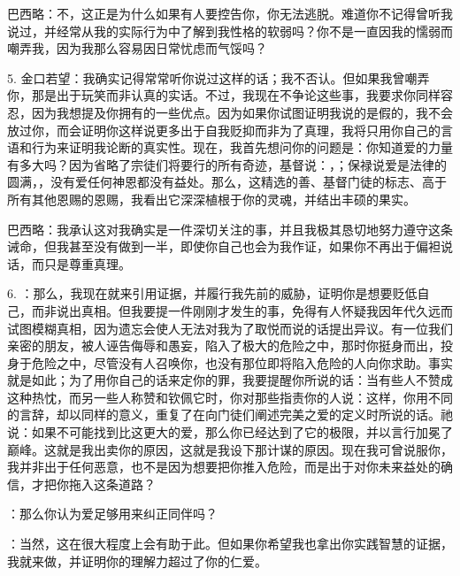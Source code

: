 巴西略：不，这正是为什么如果有人要控告你，你无法逃脱。难道你不记得曾听我说过，并经常从我的实际行为中了解到我性格的软弱吗？你不是一直因我的懦弱而嘲弄我，因为我那么容易因日常忧虑而气馁吗？\par

5. 金口若望：我确实记得常常听你说过这样的话；我不否认。但如果我曾嘲弄你，那是出于玩笑而非认真的实话。不过，我现在不争论这些事，我要求你同样容忍，因为我想提及你拥有的一些优点。因为如果你试图证明我说的是假的，我不会放过你，而会证明你这样说更多出于自我贬抑而非为了真理，我将只用你自己的言语和行为来证明我论断的真实性。现在，我首先想问你的问题是：你知道爱的力量有多大吗？因为省略了宗徒们将要行的所有奇迹，基督说：，；保禄说爱是法律的圆满，，没有爱任何神恩都没有益处。那么，这精选的善、基督门徒的标志、高于所有其他恩赐的恩赐，我看出它深深植根于你的灵魂，并结出丰硕的果实。\par

巴西略：我承认这对我确实是一件深切关注的事，并且我极其恳切地努力遵守这条诫命，但我甚至没有做到一半，即使你自己也会为我作证，如果你不再出于偏袒说话，而只是尊重真理。\par

6. ：那么，我现在就来引用证据，并履行我先前的威胁，证明你是想要贬低自己，而非说出真相。但我要提一件刚刚才发生的事，免得有人怀疑我因年代久远而试图模糊真相，因为遗忘会使人无法对我为了取悦而说的话提出异议。有一位我们亲密的朋友，被人诬告侮辱和愚妄，陷入了极大的危险之中，那时你挺身而出，投身于危险之中，尽管没有人召唤你，也没有那位即将陷入危险的人向你求助。事实就是如此；为了用你自己的话来定你的罪，我要提醒你所说的话：当有些人不赞成这种热忱，而另一些人称赞和钦佩它时，你对那些指责你的人说：这样，你用不同的言辞，却以同样的意义，重复了在向门徒们阐述完美之爱的定义时所说的话。祂说：如果不可能找到比这更大的爱，那么你已经达到了它的极限，并以言行加冕了巅峰。这就是我出卖你的原因，这就是我设下那计谋的原因。现在我可曾说服你，我并非出于任何恶意，也不是因为想要把你推入危险，而是出于对你未来益处的确信，才把你拖入这条道路？\par

：那么你认为爱足够用来纠正同伴吗？\par

：当然，这在很大程度上会有助于此。但如果你希望我也拿出你实践智慧的证据，我就来做，并证明你的理解力超过了你的仁爱。\par

